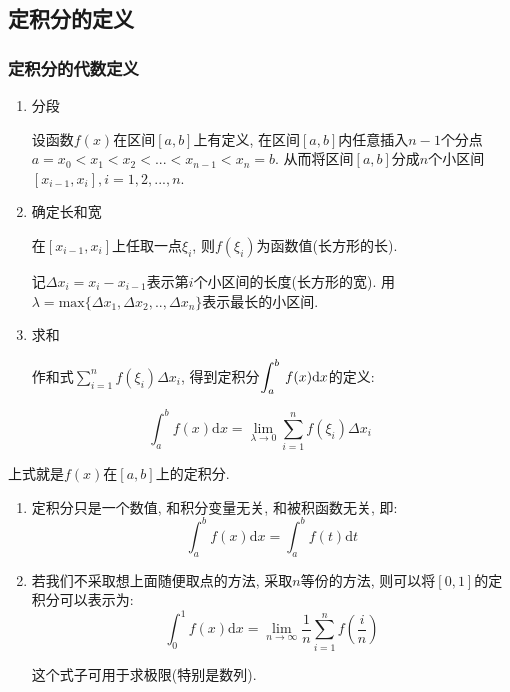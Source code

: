 \subsection{定积分的定义}
\subsubsection{定积分的代数定义}
\begin{enumerate}
\item 分段 \par 设函数$ f(x) $在区间$ [a,b] $上有定义, 在区间$ [a,b] $内任意插入$ n-1 $个分点$ a=x_{0}<x_{1}<x_{2}<...<x_{n-1}<x_{n}=b $. 从而将区间$ [a,b] $分成$ n $个小区间$ [x_{i-1},x_{i}], i=1,2,...,n $.
\item 确定长和宽 \par 在$ [x_{i-1},x_{i}] $上任取一点$ \xi_{i} $, 则$ f(\xi_{i}) $为函数值(长方形的长). \par 记$ \Delta x_{i}=x_{i}-x_{i-1} $表示第$ i $个小区间的长度(长方形的宽). 用$ \lambda=\mathrm{max}\{\Delta x_{1}, \Delta x_{2},..,\Delta x_{n}\} $表示最长的小区间.
\item 求和 \par  作和式$ \sum\limits^{n}_{i=1}f(\xi_{i})\Delta x_{i} $, 得到定积分$ \displaystyle\int_{a}^{b}\hspace{.2em}f(x)\mathrm{d}x $的定义:
\end{enumerate}
\begin{equation*}
\displaystyle\int_{a}^{b}f(x)\mathrm{d}x=\lim\limits_{\lambda\rightarrow 0}\sum_{i=1}^{n}f(\xi_{i})\Delta x_{i}
\end{equation*}\par 上式就是$ f(x) $在$ [a,b] $上的定积分.
\begin{tcolorbox}
\begin{enumerate}
\item 定积分只是一个数值, 和积分变量无关, 和被积函数无关, 即:
\begin{equation*}
\displaystyle\int_{a}^{b}f(x)\mathrm{d}x=\displaystyle\int_{a}^{b}f(t)\mathrm{d}t
\end{equation*}
\item 若我们不采取想上面随便取点的方法, 采取$ n $等份的方法, 则可以将$ [0,1] $的定积分可以表示为:
\begin{equation*}
\displaystyle\int_{0}^{1}f(x)\mathrm{d}x=\lim\limits_{n\rightarrow\infty}\frac{1}{n}\sum_{i=1}^{n}f(\frac{i}{n})
\end{equation*}\par 这个式子可用于求极限(特别是数列).
\end{enumerate}
\end{tcolorbox}
